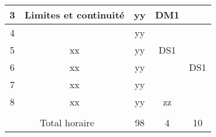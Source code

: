 \documentclass{article}
\begin{document}
\begin{table}[]
\begin{tabular}{|ccccc|}
  \multicolumn{1}{|c|}{3}                                                 & \multicolumn{1}{c|}{\multirow{-3}{*}{Limites et continuité}}                    & \multicolumn{1}{c|}{\cellcolor[HTML]{CD9934}yy}                                 & \multicolumn{1}{c|}{DM1}                                             &                         \\ \hline
  \multicolumn{1}{|c|}{4}                                                 & \multicolumn{1}{c|}{}                                                           & \multicolumn{1}{c|}{\cellcolor[HTML]{CD9934}yy}                                 & \multicolumn{1}{c|}{}                                                &                         \\ \cline{1-1} \cline{3-5} 
  \multicolumn{1}{|c|}{\cellcolor[HTML]{CD9934}5}                         & \multicolumn{1}{c|}{\multirow{-2}{*}{xx}}                                       & \multicolumn{1}{c|}{\cellcolor[HTML]{CD9934}yy}                                 & \multicolumn{1}{c|}{\cellcolor[HTML]{CD9934}DS1}                     &                         \\ \hline
  \multicolumn{1}{|c|}{6}                                                 & \multicolumn{1}{c|}{xx}                                                         & \multicolumn{1}{c|}{\cellcolor[HTML]{CD9934}yy}                                 & \multicolumn{1}{c|}{}                                                & DS1                     \\ \hline
  \multicolumn{1}{|c|}{7}                                                 & \multicolumn{1}{c|}{xx}                                                         & \multicolumn{1}{c|}{\cellcolor[HTML]{CD9934}yy}                                 & \multicolumn{1}{c|}{}                                                &                         \\ \hline
  \multicolumn{1}{|c|}{8}                                                 & \multicolumn{1}{c|}{xx}                                                         & \multicolumn{1}{c|}{\cellcolor[HTML]{CD9934}yy}                                 & \multicolumn{1}{c|}{zz}                                              &                         \\ \hline
  \rowcolor[HTML]{FFFE65} 
  \multicolumn{1}{|c|}{\cellcolor[HTML]{FFFE65}{\color[HTML]{000000} }}   & \multicolumn{1}{c|}{\cellcolor[HTML]{FFFE65}{\color[HTML]{000000} }}            & \multicolumn{1}{c|}{\cellcolor[HTML]{FFFE65}{\color[HTML]{000000} }}            & \multicolumn{1}{c|}{\cellcolor[HTML]{FFFE65}{\color[HTML]{000000} }} & {\color[HTML]{000000} } \\ \hline
  \multicolumn{2}{|c|}{Total horaire}                                                                                                                       & \multicolumn{1}{c|}{\cellcolor[HTML]{CD9934}98}                                 & \multicolumn{1}{c|}{4}                                               & 10                      \\ \hline
  \end{tabular}
  \end{table}
\end{document}
